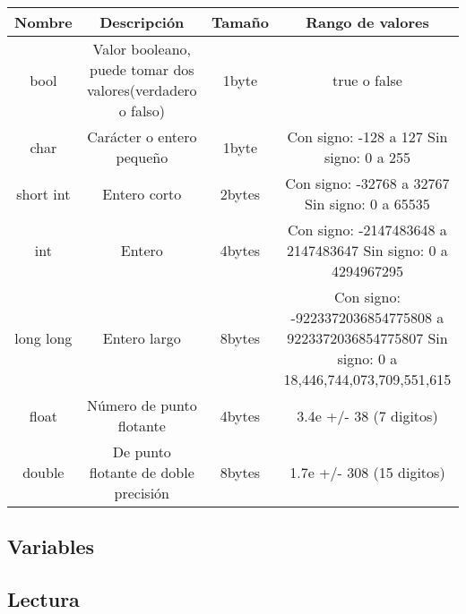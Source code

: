 \begin{center}
	\begin{tabular}{|c|c|c|c|}
		\hline
		Nombre & Descripción & Tamaño & Rango de valores\\
		\hline
		bool & Valor booleano, puede tomar dos valores(verdadero o falso) & 1byte & true o false\\
		\hline
		char & Carácter o entero pequeño & 1byte & Con signo: -128 a 127 Sin signo: 0 a 255\\
		\hline
		short int & Entero corto & 2bytes & Con signo: -32768 a 32767 Sin signo: 0 a 65535\\
		\hline
		int & Entero & 4bytes & Con signo: -2147483648 a 2147483647 Sin signo: 0 a 4294967295\\
		\hline
		long long & Entero largo & 8bytes & Con signo: -9223372036854775808 a 9223372036854775807 Sin signo: 0 a 18,446,744,073,709,551,615\\
		\hline
		float & Número de punto flotante & 4bytes & 3.4e +/- 38 (7 digitos)\\
		\hline
		double & De punto flotante de doble precisión & 8bytes & 1.7e +/- 308 (15 digitos)\\
		\hline
	\end{tabular}
\end{center}




\subsection{Variables}




\subsection{Lectura}